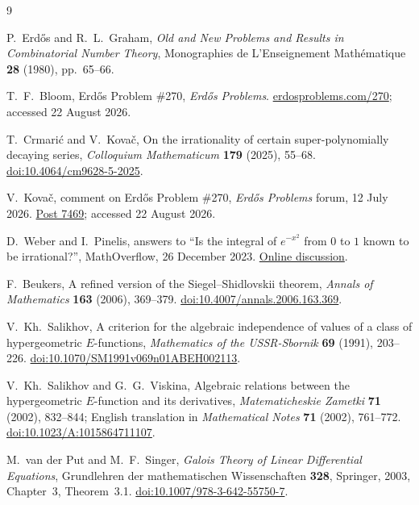 \documentclass[12pt]{article}
\begin{document}
\clearpage
\begin{thebibliography}{9}
\footnotesize
\raggedright
\setlength{\itemsep}{0pt}
\setlength{\parskip}{0pt}

P.~Erd\H{o}s and R.~L.~Graham, \emph{Old and New Problems and Results in Combinatorial Number Theory}, Monographies de L'Enseignement Math\'ematique \textbf{28} (1980), pp.~65--66.

T.~F.~Bloom, Erd\H{o}s Problem \#270, \emph{Erd\H{o}s Problems}. \href{https://www.erdosproblems.com/270}{erdosproblems.com/270}; accessed 22 August 2026.

T.~Crmari\'c and V.~Kova\v{c}, On the irrationality of certain super-polynomially decaying series, \emph{Colloquium Mathematicum} \textbf{179} (2025), 55--68. \href{https://doi.org/10.4064/cm9628-5-2025}{doi:10.4064/cm9628-5-2025}.

V.~Kova\v{c}, comment on Erd\H{o}s Problem \#270, \emph{Erd\H{o}s Problems} forum, 12 July 2026. \href{https://www.erdosproblems.com/forum/thread/270\#post-7469}{Post 7469}; accessed 22 August 2026.

D.~Weber and I.~Pinelis, answers to ``Is the integral of $e^{-x^2}$ from $0$ to $1$ known to be irrational?'', MathOverflow, 26 December 2023. \href{https://mathoverflow.net/questions/461028/}{Online discussion}.

F.~Beukers, A refined version of the Siegel--Shidlovskii theorem, \emph{Annals of Mathematics} \textbf{163} (2006), 369--379. \href{https://doi.org/10.4007/annals.2006.163.369}{doi:10.4007/annals.2006.163.369}.

V.~Kh.~Salikhov, A criterion for the algebraic independence of values of a class of hypergeometric $E$-functions, \emph{Mathematics of the USSR-Sbornik} \textbf{69} (1991), 203--226. \href{https://doi.org/10.1070/SM1991v069n01ABEH002113}{doi:10.1070/SM1991v069n01ABEH002113}.

V.~Kh.~Salikhov and G.~G.~Viskina, Algebraic relations between the hypergeometric $E$-function and its derivatives, \emph{Matematicheskie Zametki} \textbf{71} (2002), 832--844; English translation in \emph{Mathematical Notes} \textbf{71} (2002), 761--772. \href{https://doi.org/10.1023/A:1015864711107}{doi:10.1023/A:1015864711107}.

M.~van der Put and M.~F.~Singer, \emph{Galois Theory of Linear Differential Equations}, Grundlehren der mathematischen Wissenschaften \textbf{328}, Springer, 2003, Chapter~3, Theorem~3.1. \href{https://doi.org/10.1007/978-3-642-55750-7}{doi:10.1007/978-3-642-55750-7}.

\end{thebibliography}
\end{document}
